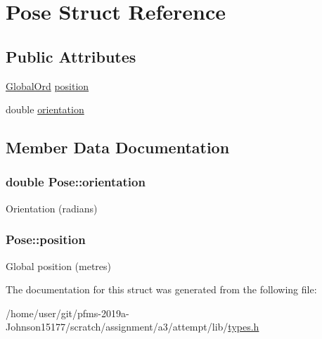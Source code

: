 \hypertarget{structPose}{}\section{Pose Struct Reference}
\label{structPose}
\subsection*{Public Attributes}
\begin{DoxyCompactItemize}
\item 
\hyperlink{structGlobalOrd}{Global\+Ord} \hyperlink{structPose_aba2eb8f799d1d392757d6c9490179720}{position}
\item 
double \hyperlink{structPose_a94d058eaab99263c6ab43bf53f4ebd9a}{orientation}
\end{DoxyCompactItemize}


\subsection{Member Data Documentation}
\subsubsection[{\texorpdfstring{orientation}{orientation}}]{\setlength{\rightskip}{0pt plus 5cm}double Pose\+::orientation}\hypertarget{structPose_a94d058eaab99263c6ab43bf53f4ebd9a}{}\label{structPose_a94d058eaab99263c6ab43bf53f4ebd9a}
Orientation (radians) 
\subsubsection[{\texorpdfstring{position}{position}}]{ Pose\+::position}\hypertarget{structPose_aba2eb8f799d1d392757d6c9490179720}{}\label{structPose_aba2eb8f799d1d392757d6c9490179720}
Global position (metres) 

The documentation for this struct was generated from the following file\+:\begin{DoxyCompactItemize}
\item 
/home/user/git/pfms-\/2019a-\/\+Johnson15177/scratch/assignment/a3/attempt/lib/\hyperlink{types_8h}{types.\+h}\end{DoxyCompactItemize}
